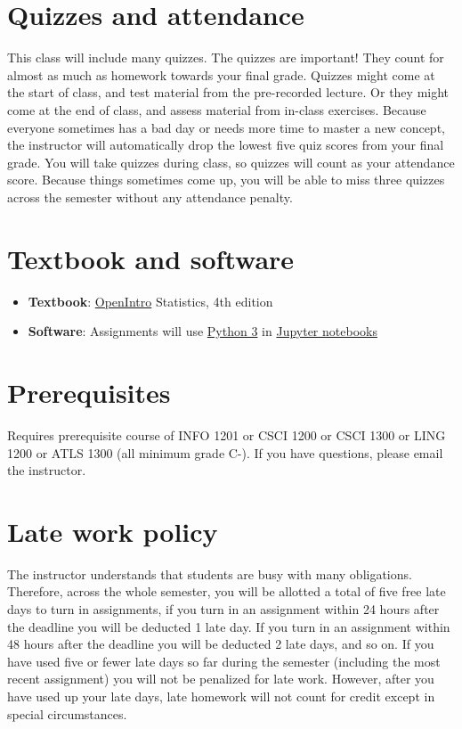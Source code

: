 \documentclass[10pt]{memoir}
\begin{document}
\section{\textbf{Quizzes and attendance}}

This class will include many quizzes. The quizzes are important! They count for almost as much as homework towards your final grade. Quizzes might come at the start of class, and test material from the pre-recorded lecture. Or they might come at the end of class, and assess material from in-class exercises. Because everyone sometimes has a bad day or needs more time to master a new concept, the instructor will automatically drop the lowest five quiz scores from your final grade. You will take quizzes during class, so quizzes will count as your attendance score. Because things sometimes come up, you will be able to miss three quizzes across the semester without any attendance penalty. 

\section{\textbf{Textbook and software }}

\begin{itemize}
\item \textbf{Textbook}: \href{https://www.abehandler.com/resources/openintro-statistics.pdf}{OpenIntro} Statistics, 4th edition
\item \textbf{Software}: Assignments will use \href{https://www.python.org/}{Python 3} in \href{https://jupyter.org/}{Jupyter notebooks}
\end{itemize}

\section{\textbf{Prerequisites}}

Requires prerequisite course of INFO 1201 or CSCI 1200 or CSCI 1300 or LING 1200 or ATLS 1300 (all minimum grade C-). If you have questions, please email the instructor.

\section{\textbf{Late work policy}}
The instructor understands that students are busy with many obligations. Therefore, across the whole semester, you will be allotted a total of five free late days to turn in assignments, if you turn in an assignment within 24 hours after the deadline you will be deducted 1 late day. If you turn in an assignment within 48 hours after the deadline you will be deducted 2 late days, and so on. If you have used five or fewer late days so far during the semester (including the most recent assignment) you will not be penalized for late work. However, after you have used up your late days, late homework will not count for credit except in special circumstances.
\end{document}
